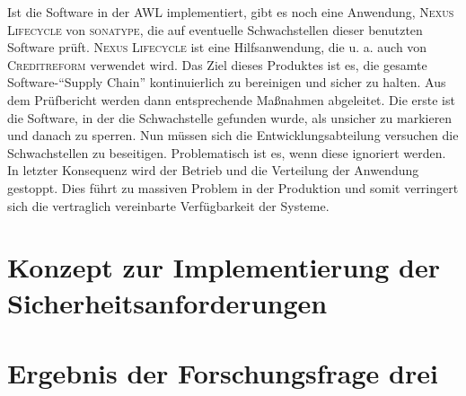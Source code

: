 Ist die Software in der \ac{AWL} implementiert, gibt es noch eine Anwendung, \textsc{Nexus Lifecycle} von \textsc{sonatype}, die auf eventuelle Schwachstellen dieser benutzten Software prüft. \textsc{Nexus Lifecycle} ist eine Hilfsanwendung, die u. a. auch von \textsc{Creditreform} verwendet wird. Das Ziel dieses Produktes ist es, die gesamte Software-\enquote{Supply Chain} kontinuierlich zu bereinigen und sicher zu halten.\autocite[vgl.][]{sonatype_inc._nexus_2020} Aus dem Prüfbericht werden dann entsprechende Maßnahmen abgeleitet. Die erste ist die Software, in der die Schwachstelle gefunden wurde, als unsicher zu markieren und danach zu sperren. Nun müssen sich die Entwicklungsabteilung versuchen die Schwachstellen zu beseitigen. Problematisch ist es, wenn diese ignoriert werden. In letzter Konsequenz wird der Betrieb und die Verteilung der Anwendung gestoppt. Dies führt zu massiven Problem in der Produktion und somit verringert sich die vertraglich vereinbarte Verfügbarkeit der Systeme.

\section{Konzept zur Implementierung der Sicherheitsanforderungen}

\section{Ergebnis der Forschungsfrage drei}


